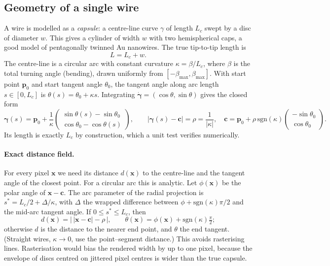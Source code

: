 \documentclass[11pt,a4paper]{article}
\begin{document}
\subsection{Geometry of a single wire}
A wire is modelled as a \emph{capsule}: a centre-line curve $\gamma$ of length $L_c$ swept by a disc of diameter $w$. This gives a cylinder of width $w$ with two hemispherical caps, a good model of pentagonally twinned Au nanowires. The true tip-to-tip length is
\begin{equation}
L = L_c + w. \label{eq:capsule}
\end{equation}
The centre-line is a circular arc with constant curvature $\kappa=\beta/L_c$, where $\beta$ is the total turning angle (bending), drawn uniformly from $[-\beta_{\max},\beta_{\max}]$. With start point $\mathbf p_0$ and start tangent angle $\theta_0$, the tangent angle along arc length $s\in[0,L_c]$ is $\theta(s)=\theta_0+\kappa s$. Integrating $\dot{\bm\gamma}=(\cos\theta,\sin\theta)$ gives the closed form
\begin{equation}
\bm\gamma(s)=\mathbf p_0+\frac1\kappa\begin{pmatrix}\sin\theta(s)-\sin\theta_0\\ \cos\theta_0-\cos\theta(s)\end{pmatrix},\qquad
|\bm\gamma(s)-\mathbf c| = \rho = \frac1{|\kappa|},\quad
\mathbf c = \mathbf p_0+\rho\,\mathrm{sgn}(\kappa)\begin{pmatrix}-\sin\theta_0\\ \cos\theta_0\end{pmatrix}.
\end{equation}
Its length is exactly $L_c$ by construction, which a unit test verifies numerically.

\paragraph{Exact distance field.} For every pixel $\mathbf x$ we need its distance $d(\mathbf x)$ to the centre-line and the tangent angle of the closest point. For a circular arc this is analytic. Let $\phi(\mathbf x)$ be the polar angle of $\mathbf x-\mathbf c$. The arc parameter of the radial projection is $s^*=L_c/2+\Delta/\kappa$, with $\Delta$ the wrapped difference between $\phi+\mathrm{sgn}(\kappa)\pi/2$ and the mid-arc tangent angle. If $0\le s^*\le L_c$, then
\begin{equation}
d(\mathbf x)=\bigl|\,|\mathbf x-\mathbf c|-\rho\,\bigr|,\qquad \theta(\mathbf x)=\phi(\mathbf x)+\mathrm{sgn}(\kappa)\tfrac\pi2;
\end{equation}
otherwise $d$ is the distance to the nearer end point, and $\theta$ the end tangent. (Straight wires, $\kappa\to0$, use the point--segment distance.) This avoids rasterising lines. Rasterisation would bias the rendered width by up to one pixel, because the envelope of discs centred on jittered pixel centres is wider than the true capsule.
\end{document}
